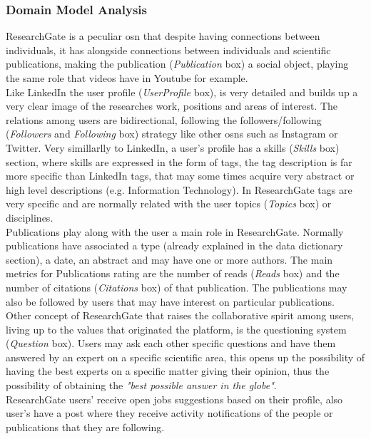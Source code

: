 \subsubsection*{Domain Model Analysis}
ResearchGate is a peculiar \gls{osn} that despite having connections between individuals, it has alongside connections between individuals and scientific publications,
making the publication (\textit{Publication} box) a social object, playing the same role that videos have in Youtube for example.\\
\indent Like LinkedIn the user profile (\textit{UserProfile} box), is very detailed and builds up a very clear image of the researches work, positions and areas of interest. The relations
among users are bidirectional, following the followers/following (\textit{Followers} and \textit{Following} box) strategy like other \glspl{osn} such as Instagram or Twitter. Very simillarlly to LinkedIn, a
user's profile has a skills (\textit{Skills} box) section, where skills are expressed in the form of tags, the tag description is far more specific than LinkedIn tags, that may some times acquire very abstract or high level descriptions (e.g. Information Technology). In ResearchGate tags are very specific and are normally related with the user topics (\textit{Topics} box) or disciplines.\\
\indent Publications play along with the user a main role in ResearchGate. Normally publications have associated a type (already explained in the data dictionary section), a date, an abstract and may have one or more authors. The main metrics for Publications rating are the number of reads (\textit{Reads} box) and the number of
citations (\textit{Citations} box) of that publication. The publications may also be followed by users that may have interest on particular publications.\\
\indent Other concept of ResearchGate that raises the collaborative spirit among users, living up to the values that originated the platform, is the questioning system
(\textit{Question} box). Users may ask each other specific questions and have them answered by an expert on a specific scientific area, this opens up the possibility of having
the best experts on a specific matter giving their opinion, thus the possibility of obtaining the \textit{"best possible answer in the globe"}.\\
\indent ResearchGate users' receive open jobs suggestions based on their profile, also user's have a post where they receive activity notifications of the people
or publications that they are following.

